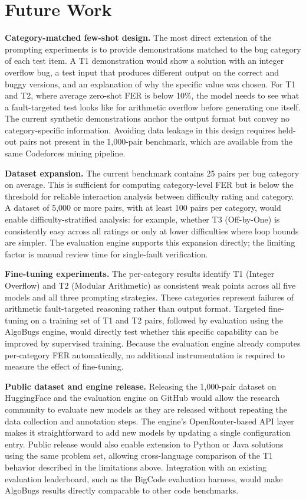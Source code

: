 \section{Future Work}

\textbf{Category-matched few-shot design.} The most direct extension of the prompting experiments is to provide demonstrations matched to the bug category of each test item. A T1 demonstration would show a solution with an integer overflow bug, a test input that produces different output on the correct and buggy versions, and an explanation of why the specific value was chosen. For T1 and T2, where average zero-shot FER is below 10\%, the model needs to see what a fault-targeted test looks like for arithmetic overflow before generating one itself. The current synthetic demonstrations anchor the output format but convey no category-specific information. Avoiding data leakage in this design requires held-out pairs not present in the 1,000-pair benchmark, which are available from the same Codeforces mining pipeline.

\textbf{Dataset expansion.} The current benchmark contains 25 pairs per bug category on average. This is sufficient for computing category-level FER but is below the threshold for reliable interaction analysis between difficulty rating and category. A dataset of 5,000 or more pairs, with at least 100 pairs per category, would enable difficulty-stratified analysis: for example, whether T3 (Off-by-One) is consistently easy across all ratings or only at lower difficulties where loop bounds are simpler. The evaluation engine supports this expansion directly; the limiting factor is manual review time for single-fault verification.

\textbf{Fine-tuning experiments.} The per-category results identify T1 (Integer Overflow) and T2 (Modular Arithmetic) as consistent weak points across all five models and all three prompting strategies. These categories represent failures of arithmetic fault-targeted reasoning rather than output format. Targeted fine-tuning on a training set of T1 and T2 pairs, followed by evaluation using the AlgoBugs engine, would directly test whether this specific capability can be improved by supervised training. Because the evaluation engine already computes per-category FER automatically, no additional instrumentation is required to measure the effect of fine-tuning.

\textbf{Public dataset and engine release.} Releasing the 1,000-pair dataset on HuggingFace and the evaluation engine on GitHub would allow the research community to evaluate new models as they are released without repeating the data collection and annotation steps. The engine's OpenRouter-based API layer makes it straightforward to add new models by updating a single configuration entry. Public release would also enable extension to Python or Java solutions using the same problem set, allowing cross-language comparison of the T1 behavior described in the limitations above. Integration with an existing evaluation leaderboard, such as the BigCode evaluation harness, would make AlgoBugs results directly comparable to other code benchmarks.

